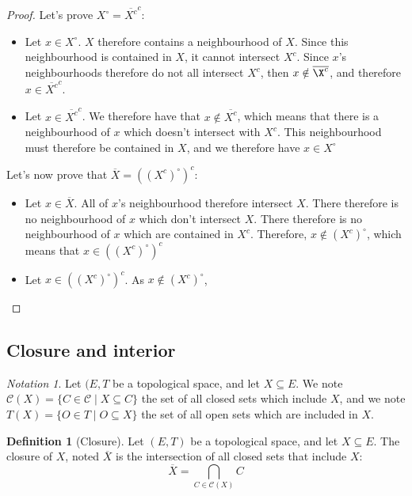 \documentclass{article}
\theoremstyle{definition}
\newtheorem{definition}{Definition}[section]
\theoremstyle{remark}
\theoremstyle{example}
\theoremstyle{notation}
\newtheorem{notation}{Notation}[section]
\newcommand{\inter}[1]{{{#1}^\circ}}
\newcommand{\closed}{\mathcal{C}}
\begin{document}
\begin{proof}
		Let's prove $\inter{X} = \overline{X^c}^c$:
		\begin{itemize}
				\item Let $x \in \inter{X}$. $X$ therefore contains a neighbourhood of $X$. Since this neighbourhood is contained in $X$, it cannot intersect $X^c$. Since $x$'s neighbourhoods therefore do not all intersect $X^c$, then $x \notin \overline{\X^c}$, and therefore $x \in \overline{X^c}^c$.
				\item Let $x \in \overline{X^c}^c$. We therefore have that $x \notin \overline{X^c}$, which means that there is a neighbourhood of $x$ which doesn't intersect with $X^c$. This neighbourhood must therefore be contained in $X$, and we therefore have $x \in \inter{X}$
		\end{itemize}
		Let's now prove that $\overline{X} = (\inter{(X^c)})^c$:
		\begin{itemize}
				\item Let $x \in \overline{X}$. All of $x$'s neighbourhood therefore intersect $X$. There therefore is no neighbourhood of $x$ which don't intersect $X$. There therefore is no neighbourhood of $x$ which are contained in $X^c$. Therefore, $x \notin \inter{(X^c)}$, which means that $x \in (\inter{(X^c)})^c$
				\item Let $x \in (\inter{(X^c)})^c$. As $x \notin \inter{(X^c)}$, 
		\end{itemize}
\end{proof}

\subsection{Closure and interior}

\begin{notation}
		Let $(E, T$ be a topological space, and let $X \subseteq E$. We note $\closed(X) = \{C \in \closed \mid X \subseteq C\}$ the set of all closed sets which include $X$, and we note $T(X) = \{O \in T \mid O \subseteq X\}$ the set of all open sets which are included in $X$.
\end{notation}

\begin{definition}[Closure] %
		Let $(E, T)$ be a topological space, and let $X \subseteq E$. The closure of $X$, noted $\overline{X}$ is the intersection of all closed sets that include $X$:
				$$\overline{X} = \bigcap_{C \in \closed(X)} C$$
\end{definition}
\end{document}
